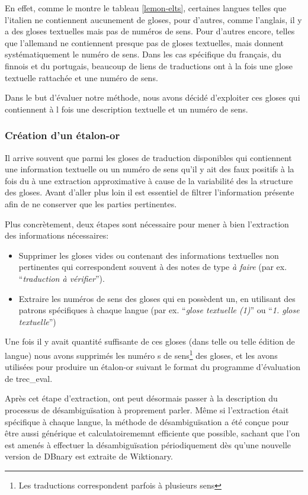 \documentclass[10pt,a4paper,twoside]{article}
\begin{document}
En effet, comme le montre le tableau \ref{lemon-elts}, certaines langues telles que l'italien ne contiennent aucunement de gloses, pour d'autres, comme l'anglais, il y a des gloses textuelles mais pas de numéros de sens. Pour d'autres encore, telles que l'allemand ne contiennent presque pas de gloses textuelles, mais donnent systématiquement le numéro de sens. Dans les cas spécifique du français, du finnois et du portugais, beaucoup de liens de traductions ont à la fois une glose textuelle rattachée et une numéro de sens.

Dans le but d'évaluer notre méthode, nous avons décidé d'exploiter ces gloses qui contiennent à l fois une description textuelle et un numéro de sens.


\subsubsection{Création d'un étalon-or}
Il arrive souvent que parmi les gloses de traduction disponibles qui contiennent une information textuelle ou un numéro de sens qu'il y ait des faux positifs à la fois du à une extraction approximative à cause de la variabilité des la structure des gloses. Avant d'aller plus loin il est essentiel de filtrer l'information présente afin de ne conserver que les parties pertinentes.

Plus concrètement, deux étapes sont nécessaire pour mener à bien l'extraction des informations nécessaires:
\begin{itemize}
	\item Supprimer les gloses vides ou contenant des informations textuelles non pertinentes qui correspondent souvent à des notes de type \emph{à faire} (par ex. ``\emph{traduction à vérifier}'').
	\item Extraire les numéros de sens des gloses qui en possèdent un, en utilisant des patrons spécifiques à chaque langue (par ex. ``\emph{glose textuelle (1)}'' ou ``\emph{1. glose textuelle}'')
\end{itemize}


Une fois il y avait quantité suffisante de ces gloses (dans telle ou telle édition de langue) nous avons supprimés les numéro s de sens\footnote{Les traductions correspondent parfois à plusieurs sens} des gloses, et les avons utilisées pour produire un étalon-or suivant le format du programme d'évaluation de trec\_eval.

Après cet étape d'extraction, ont peut désormais passer à la description du processus de désambiguïsation à proprement parler. Même si l'extraction était spécifique à chaque langue, la méthode de désambiguïsation a été conçue pour être aussi générique et calculatoirememnt efficiente que possible, sachant que l'on est amenés à effectuer la désambiguïsation périodiquement dès qu'une nouvelle version de DBnary est extraite de Wiktionary.
\end{document}
